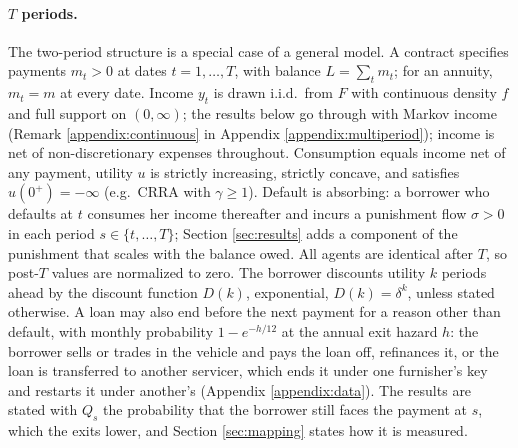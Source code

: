\paragraph{$T$ periods.} The two-period structure is a special case of a general model. A contract specifies payments $m_t > 0$ at dates $t = 1, \dots, T$, with balance $L = \sum_t m_t$; for an annuity, $m_t = m$ at every date. Income $y_t$ is drawn i.i.d.\ from $F$ with continuous density $f$ and full support on $(0,\infty)$; the results below go through with Markov income (Remark \ref{appendix:continuous} in Appendix \ref{appendix:multiperiod}); income is net of non-discretionary expenses throughout. Consumption equals income net of any payment, utility $u$ is strictly increasing, strictly concave, and satisfies $u(0^+) = -\infty$ (e.g.\ CRRA with $\gamma \ge 1$). Default is absorbing: a borrower who defaults at $t$ consumes her income thereafter and incurs a punishment flow $\sigma > 0$ in each period $s \in \{t, \dots, T\}$; Section \ref{sec:results} adds a component of the punishment that scales with the balance owed. All agents are identical after $T$, so post-$T$ values are normalized to zero. The borrower discounts utility $k$ periods ahead by the discount function $D(k)$, exponential, $D(k) = \delta^k$, unless stated otherwise. A loan may also end before the next payment for a reason other than default, with monthly probability $1 - e^{-h/12}$ at the annual exit hazard $h$: the borrower sells or trades in the vehicle and pays the loan off, refinances it, or the loan is transferred to another servicer, which ends it under one furnisher's key and restarts it under another's (Appendix \ref{appendix:data}). The results are stated with $Q_s$ the probability that the borrower still faces the payment at $s$, which the exits lower, and Section \ref{sec:mapping} states how it is measured.

